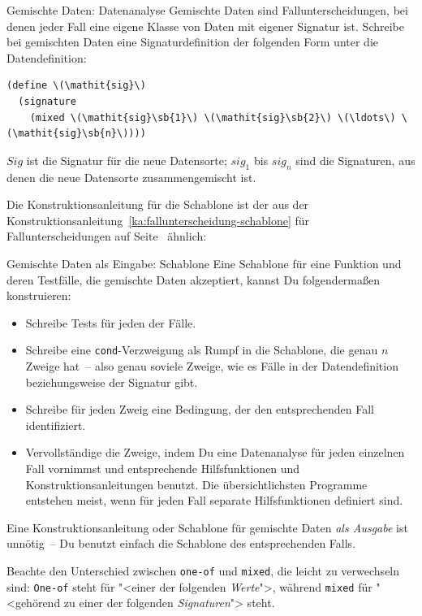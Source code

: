 \begin{konstruktionsanleitung}{Gemischte Daten: Datenanalyse}
  \label{ka:gemischt-datenanalyse}
  Gemischte Daten sind Fallunterscheidungen, bei denen jeder Fall eine
  eigene Klasse von Daten mit eigener Signatur ist.
  Schreibe bei gemischten Daten eine Signaturdefinition der folgenden Form unter die
  Datendefinition:
%
\begin{lstlisting}
(define \(\mathit{sig}\)
  (signature
    (mixed \(\mathit{sig}\sb{1}\) \(\mathit{sig}\sb{2}\) \(\ldots\) \(\mathit{sig}\sb{n}\))))
\end{lstlisting}
$\mathit{Sig}$ ist die Signatur für die neue Datensorte; $\mathit{sig}_1$ bis $\textit{sig}_n$
sind die Signaturen, aus denen die neue
Datensorte zusammengemischt ist.
\end{konstruktionsanleitung}
%
\noindent Die Konstruktionsanleitung für die Schablone ist der aus
der Konstruktionsanleitung~\ref{ka:fallunterscheidung-schablone} für
Fallunterscheidungen auf
Seite~\pageref{ka:fallunterscheidung-schablone} ähnlich:
%
\begin{konstruktionsanleitung}{Gemischte Daten als Eingabe:
    Schablone}
  \label{ka:gemischt-eingabe-schablone}
Eine Schablone für eine Funktion und deren Testfälle, die gemischte
Daten akzeptiert, kannst Du folgendermaßen konstruieren:
%
\begin{itemize}
\item Schreibe Tests für jeden der Fälle.
\item  Schreibe eine \lstinline{cond}-Verzweigung als Rumpf in die
  Schablone, die genau $n$ Zweige hat~-- also genau soviele Zweige,
  wie es Fälle in der Datendefinition beziehungsweise der Signatur gibt.
\item Schreibe für jeden Zweig eine Bedingung, der den entsprechenden
  Fall identifiziert.
\item Vervollständige die Zweige, indem Du eine Datenanalyse für
  jeden einzelnen Fall vornimmst und entsprechende Hilfsfunktionen
  und Konstruktionsanleitungen benutzt.
  Die übersichtlichsten Programme entstehen meist, wenn für jeden Fall
  separate Hilfsfunktionen definiert sind.\label{page:separate-mixed-procs}
\end{itemize}
%
\end{konstruktionsanleitung}
%
Eine Konstruktionsanleitung oder Schablone für gemischte Daten
\emph{als Ausgabe} ist unnötig~-- Du benutzt einfach die Schablone
des entsprechenden Falls.

Beachte den Unterschied zwischen \lstinline{one-of} und
\lstinline{mixed}, die leicht zu verwechseln sind: \lstinline{One-of} steht
für "<einer der folgenden \emph{Werte}">, während \lstinline{mixed} für
"<gehörend zu einer der folgenden \emph{Signaturen}"> steht.

